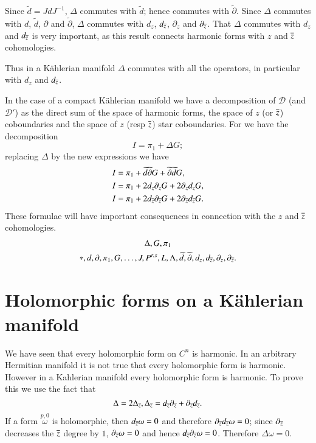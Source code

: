Since $\widetilde{d}=JdJ^{-1}$, $\Delta$ commutes with
$\widetilde{d}$; hence commutes with $\widetilde{\partial}$. Since
$\Delta$ commutes with $d$, $\widetilde{d}$, $\partial$ and
$\widetilde{\partial}$, $\Delta$ commutes with $d_{z}$, $d_{\overline{z}}$,
$\partial_{z}$ and $\partial_{\overline{z}}$. That $\Delta$ commutes with
$d_{z}$ and $d_{\overline{z}}$ is very important, as this result connects
harmonic forms with $z$ and $\overline{z}$ cohomologies.

Thus in a K\"ahlerian manifold $\Delta$ commutes with all the
operators, in particular with $d_{z}$ and $d_{\overline{z}}$.

In the case of a compact K\"ahlerian manifold we have a decomposition
of $\mathscr{D}$ (and $\mathscr{D}'$) as the direct sum of the space
of harmonic forms, the space of $z$ (or $\overline{z}$) coboundaries and the
space of $z$ (resp $\overline{z}$) star coboundaries. For we have the
decomposition
$$
I=\pi_{1}+\Delta G;
$$
replacing $\Delta$ by the new expressions we have
\begin{align*}
I &=
\pi_{1}+\widetilde{d}\widetilde{\partial}G+\widetilde{\partial}\widetilde{d}G,\\ 
I &= \pi_{1}+2d_{z}\partial_{z}G+2\partial_{z}d_{z}G,\\
I &= \pi_{1}+2d_{\overline{z}}\partial_{\overline{z}}G+2\partial_{\overline{z}}d_{\overline{z}}G.
\end{align*}
These formulae will have important consequences in connection with the
$z$ and $\overline{z}$ cohomologies.
\begin{gather*}
\Delta, G,\pi_{1}\\
\ast,d,\partial,\pi_{1}, G, \ldots,J,P^{r,s}, L,
  \Lambda,\widetilde{d}, \widetilde{\partial}, d_{z}, d_{\overline{z}},
  \partial_{z}, \partial_{\overline{z}}.  
\end{gather*}
\pageoriginale

\section*{Holomorphic forms on a K\"ahlerian manifold}

We have seen that every holomorphic form on $C^{n}$ is harmonic. In an
arbitrary Hermitian manifold it is not true that every holomorphic
form is harmonic. However in a Kahlerian manifold every holomorphic
form is harmonic. To prove this we use the fact that
$$
\Delta=2\Delta_{\overline{z}},\Delta_{\overline{z}}=d_{\overline{z}}\partial_{\overline{z}}+\partial_{\overline{z}}d_{\overline{z}}.
$$
If a form $\overset{p,0}{\omega}$ is holomorphic, then
$d_{\overline{z}}\omega=0$ and therefore
$\partial_{\overline{z}}d_{\overline{z}}\omega=0$; since $\partial_{\overline{z}}$
decreases the $\overline{z}$ degree by $1$, $\partial_{\overline{z}}\omega=0$ and
hence $d_{\overline{z}}\partial_{\overline{z}}\omega=0$. Therefore
$\Delta\omega=0$.



